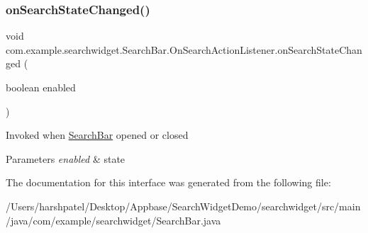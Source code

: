 \subsubsection{\texorpdfstring{onSearchStateChanged()}{onSearchStateChanged()}}
{\footnotesize\ttfamily void com.\+example.\+searchwidget.\+Search\+Bar.\+On\+Search\+Action\+Listener.\+on\+Search\+State\+Changed (\begin{DoxyParamCaption}\item[{boolean}]{enabled }\end{DoxyParamCaption})}

Invoked when \mbox{\hyperlink{classcom_1_1example_1_1searchwidget_1_1_search_bar}{Search\+Bar}} opened or closed


\begin{DoxyParams}{Parameters}
{\em enabled} & state \\
\hline
\end{DoxyParams}


The documentation for this interface was generated from the following file\+:\begin{DoxyCompactItemize}
\item 
/\+Users/harshpatel/\+Desktop/\+Appbase/\+Search\+Widget\+Demo/searchwidget/src/main/java/com/example/searchwidget/Search\+Bar.\+java\end{DoxyCompactItemize}
